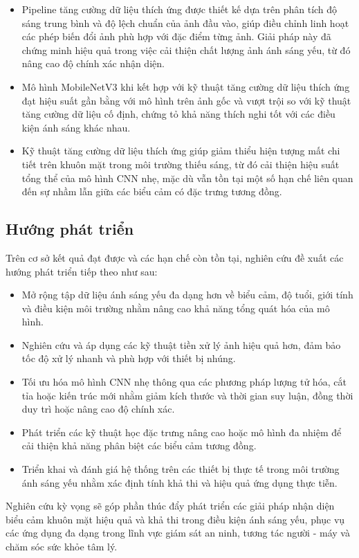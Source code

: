 \begin{itemize}
\item Pipeline tăng cường dữ liệu thích ứng được thiết kế dựa trên phân tích độ sáng trung bình và độ lệch chuẩn của ảnh đầu vào, giúp điều chỉnh linh hoạt các phép biến đổi ảnh phù hợp với đặc điểm từng ảnh. Giải pháp này đã chứng minh hiệu quả trong việc cải thiện chất lượng ảnh ánh sáng yếu, từ đó nâng cao độ chính xác nhận diện.
\item Mô hình MobileNetV3 khi kết hợp với kỹ thuật tăng cường dữ liệu thích ứng đạt hiệu suất gần bằng với mô hình trên ảnh gốc và vượt trội so với kỹ thuật tăng cường dữ liệu cố định, chứng tỏ khả năng thích nghi tốt với các điều kiện ánh sáng khác nhau.
\item Kỹ thuật tăng cường dữ liệu thích ứng giúp giảm thiểu hiện tượng mất chi tiết trên khuôn mặt trong môi trường thiếu sáng, từ đó cải thiện hiệu suất tổng thể của mô hình CNN nhẹ, mặc dù vẫn tồn tại một số hạn chế liên quan đến sự nhầm lẫn giữa các biểu cảm có đặc trưng tương đồng.
\end{itemize}

\subsection{Hướng phát triển}

Trên cơ sở kết quả đạt được và các hạn chế còn tồn tại, nghiên cứu đề xuất các hướng phát triển tiếp theo như sau:

\begin{itemize}
\item Mở rộng tập dữ liệu ánh sáng yếu đa dạng hơn về biểu cảm, độ tuổi, giới tính và điều kiện môi trường nhằm nâng cao khả năng tổng quát hóa của mô hình.
\item Nghiên cứu và áp dụng các kỹ thuật tiền xử lý ảnh hiệu quả hơn, đảm bảo tốc độ xử lý nhanh và phù hợp với thiết bị nhúng.
\item Tối ưu hóa mô hình CNN nhẹ thông qua các phương pháp lượng tử hóa, cắt tỉa hoặc kiến trúc mới nhằm giảm kích thước và thời gian suy luận, đồng thời duy trì hoặc nâng cao độ chính xác.
\item Phát triển các kỹ thuật học đặc trưng nâng cao hoặc mô hình đa nhiệm để cải thiện khả năng phân biệt các biểu cảm tương đồng.
\item Triển khai và đánh giá hệ thống trên các thiết bị thực tế trong môi trường ánh sáng yếu nhằm xác định tính khả thi và hiệu quả ứng dụng thực tiễn.
\end{itemize}

Nghiên cứu kỳ vọng sẽ góp phần thúc đẩy phát triển các giải pháp nhận diện biểu cảm khuôn mặt hiệu quả và khả thi trong điều kiện ánh sáng yếu, phục vụ các ứng dụng đa dạng trong lĩnh vực giám sát an ninh, tương tác người - máy và chăm sóc sức khỏe tâm lý.